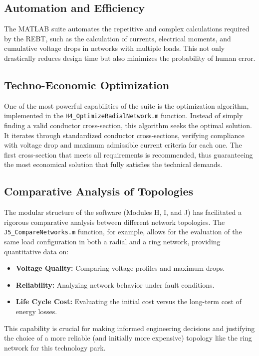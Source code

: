 \documentclass[12pt, a4paper]{report}
\begin{document}
\subsection{Automation and Efficiency}
The MATLAB suite automates the repetitive and complex calculations required by the REBT, such as the calculation of currents, electrical moments, and cumulative voltage drops in networks with multiple loads. This not only drastically reduces design time but also minimizes the probability of human error.

\subsection{Techno-Economic Optimization}
One of the most powerful capabilities of the suite is the optimization algorithm, implemented in the \texttt{H4\_OptimizeRadialNetwork.m} function. Instead of simply finding a valid conductor cross-section, this algorithm seeks the optimal solution. It iterates through standardized conductor cross-sections, verifying compliance with voltage drop and maximum admissible current criteria for each one. The first cross-section that meets all requirements is recommended, thus guaranteeing the most economical solution that fully satisfies the technical demands.

\subsection{Comparative Analysis of Topologies}
The modular structure of the software (Modules H, I, and J) has facilitated a rigorous comparative analysis between different network topologies. The \texttt{J5\_CompareNetworks.m} function, for example, allows for the evaluation of the same load configuration in both a radial and a ring network, providing quantitative data on:
\begin{itemize}
    \item \textbf{Voltage Quality:} Comparing voltage profiles and maximum drops.
    \item \textbf{Reliability:} Analyzing network behavior under fault conditions.
    \item \textbf{Life Cycle Cost:} Evaluating the initial cost versus the long-term cost of energy losses.
\end{itemize}
This capability is crucial for making informed engineering decisions and justifying the choice of a more reliable (and initially more expensive) topology like the ring network for this technology park.
\end{document}
